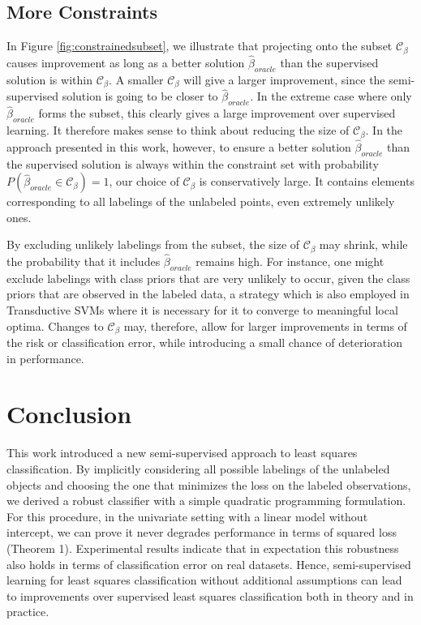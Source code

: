\documentclass[twoside]{memoir}\usepackage[]{graphicx}\usepackage{xcolor}
\newcommand{\Cb}{\mathcal{C}_{\beta}}
\begin{document}
\subsection*{More Constraints}
In Figure \ref{fig:constrainedsubset}, we illustrate that projecting onto the subset $\Cb$ causes improvement as long as a better solution $\hat{\beta}_{oracle}$ than the supervised solution is within $\Cb$. A smaller $\Cb$ will give a larger improvement, since the semi-supervised solution is going to be closer to $\hat{\beta}_{oracle}$. In the extreme case where only $\hat{\beta}_{oracle}$ forms the subset, this clearly gives a large improvement over supervised learning. It therefore makes sense to think about reducing the size of $\Cb$. In the approach presented in this work, however, to ensure a better solution $\hat{\beta}_{oracle}$ than the supervised solution is always within the constraint set with probability $P(\hat{\beta}_{oracle} \in \Cb)=1$, our choice of $\Cb$ is conservatively large. It contains elements corresponding to all labelings of the unlabeled points, even extremely unlikely ones. 

By excluding unlikely labelings from the subset, the size of $\Cb$ may shrink, while the probability that it includes $\hat{\beta}_{oracle}$ remains high. For instance, one might exclude labelings with class priors that are very unlikely to occur, given the class priors that are observed in the labeled data, a strategy which is also employed in Transductive SVMs where it is necessary for it to converge to meaningful local optima. Changes to $\Cb$ may, therefore, allow for larger improvements in terms of the risk or classification error, while introducing a small chance of deterioration in performance.

\section{Conclusion}
This work introduced a new semi-supervised approach to least squares classification. By implicitly considering all possible labelings of the unlabeled objects and choosing the one that minimizes the loss on the labeled observations, we derived a robust classifier with a simple quadratic programming formulation. For this procedure, in the univariate setting with a linear model without intercept, we can prove it never degrades performance in terms of squared loss (Theorem 1). Experimental results indicate that in expectation this robustness also holds in terms of classification error on real datasets. Hence, semi-supervised learning for least squares classification without additional assumptions can lead to improvements over supervised least squares classification both in theory and in practice.
\end{document}
